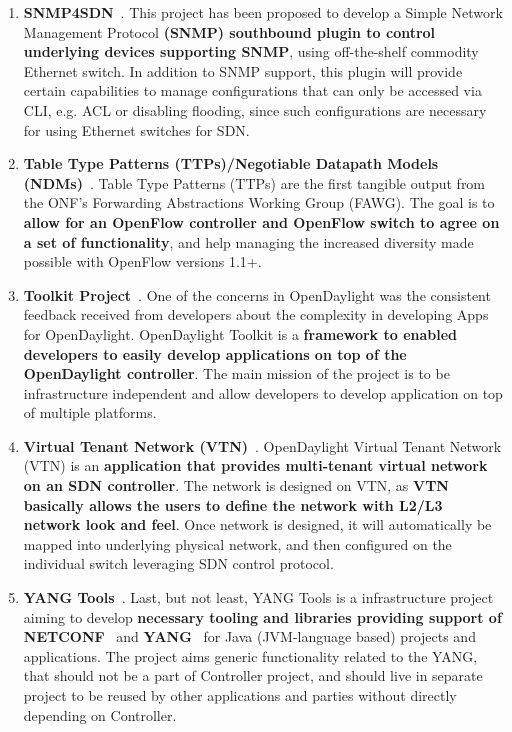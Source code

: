 \documentclass[a4paper, 12pt]{book}
\begin{document}
\begin{enumerate}
\item{\textbf{SNMP4SDN}}~\cite{OpenDaylightWikiTTP}. This project has been proposed to develop a Simple Network Management Protocol \textbf{(SNMP) southbound plugin to control underlying devices supporting SNMP}, using off-the-shelf commodity Ethernet switch. In addition to SNMP support, this plugin will provide certain capabilities to manage configurations that can only be accessed via CLI, e.g. ACL or disabling flooding, since such configurations are necessary for using Ethernet switches for SDN.
\item{\textbf{Table Type Patterns (TTPs)/Negotiable Datapath Models (NDMs)}}~\cite{OpenDaylightWiki}. Table Type Patterns (TTPs) are the first tangible output from the ONF's Forwarding Abstractions Working Group (FAWG). The goal is to \textbf{allow for an OpenFlow controller and OpenFlow switch to agree on a set of functionality}, and help managing the increased diversity made possible with OpenFlow versions 1.1+.
\item{\textbf{Toolkit Project}}~\cite{OpenDaylightWikiToolkit}. One of the concerns in OpenDaylight was the consistent feedback received from developers about the complexity in developing Apps for OpenDaylight. OpenDaylight Toolkit is a \textbf{framework to enabled developers to easily develop applications on top of the OpenDaylight controller}. The main mission of the project is to be infrastructure independent and allow developers to develop application on top of multiple platforms.
\item{\textbf{Virtual Tenant Network (VTN)}}~\cite{OpenDaylightWikiVTN}. OpenDaylight Virtual Tenant Network (VTN) is an \textbf{application that provides multi-tenant virtual network on an SDN controller}. The network is designed on VTN, as \textbf{VTN basically allows the users to define the network with L2/L3 network look and feel}. Once network is designed, it will automatically be mapped into underlying physical network, and then configured on the individual switch leveraging SDN control protocol.
\item{\textbf{YANG Tools}}~\cite{OpenDaylightWikiYANG}. Last, but not least, YANG Tools is a infrastructure project aiming to develop \textbf{necessary tooling and libraries providing support of NETCONF}~\cite{NETCONF} and \textbf{YANG}~\cite{YANG} for Java (JVM-language based) projects and applications. The project aims generic functionality related to the YANG, that should not be a part of Controller project, and should live in separate project to be reused by other applications and parties without directly depending on Controller.
\end{enumerate}
\end{document}

